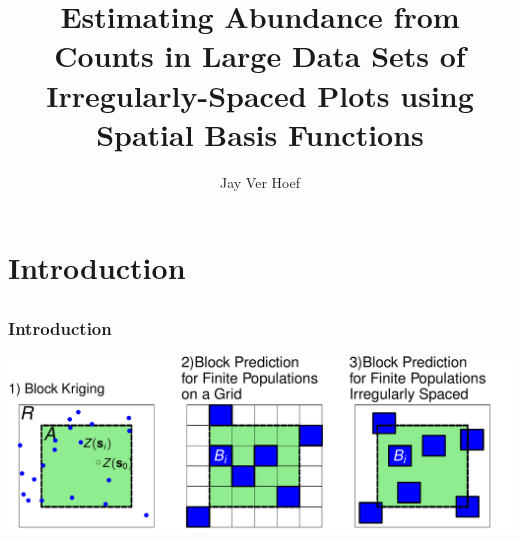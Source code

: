 \documentclass[mathserif,compress]{beamer}\usepackage{graphicx, color}
\makeatletter
\def\maxwidth{ %
  \ifdim\Gin@nat@width>\linewidth
    \linewidth
  \else
    \Gin@nat@width
  \fi
}
\makeatother
\begin{document}
\title[]{Estimating Abundance from Counts in Large Data Sets of Irregularly-Spaced Plots using Spatial Basis Functions}

\author[Jay M. Ver Hoef]{Jay Ver Hoef} 

\date[05/17/13]{}
 
\maketitle
 

\section{Introduction}
\subsection{}
\begin{frame}[fragile]
\frametitle{Introduction}
	
	\includegraphics[width=\maxwidth]{figure/Introductory-plot}

\vspace{.5cm}
\scriptsize

\end{frame}

\end{document}
